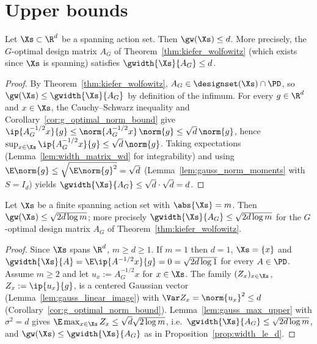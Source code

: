 \section{Upper bounds}
\label{sec:width_upper}

\begin{proposition}\label{prop:width_le_d}
\leanok
{}
Let $\Xs \subset \R^d$ be a spanning action set. Then $\gw(\Xs) \le d$. More precisely, the
$G$-optimal design matrix $A_G$ of Theorem~\ref{thm:kiefer_wolfowitz} (which exists since
$\Xs$ is spanning) satisfies $\gwidth{\Xs}{A_G} \le d$.
\end{proposition}

\begin{proof}
\leanok
{}
By Theorem~\ref{thm:kiefer_wolfowitz}, $A_G \in \designset(\Xs) \cap \PD$, so
$\gw(\Xs) \le \gwidth{\Xs}{A_G}$ by definition of the infimum. For every $g \in \R^d$ and
$x \in \Xs$, the Cauchy--Schwarz inequality and Corollary~\ref{cor:g_optimal_norm_bound}
give $\ip{A_G^{-1/2}x}{g} \le \norm{A_G^{-1/2}x}\,\norm{g} \le \sqrt d\,\norm{g}$, hence
$\sup_{x\in\Xs}\ip{A_G^{-1/2}x}{g} \le \sqrt d\,\norm{g}$. Taking expectations
(Lemma~\ref{lem:width_matrix_wd} for integrability) and using
$\E\norm{g} \le \sqrt{\E\norm{g}^2} = \sqrt d$ (Lemma~\ref{lem:gauss_norm_moments} with
$S = I_d$) yields $\gwidth{\Xs}{A_G} \le \sqrt d \cdot \sqrt d = d$.
\end{proof}

\begin{proposition}\label{prop:width_finite}
\leanok
{}
Let $\Xs$ be a finite spanning action set with $\abs{\Xs} = m$. Then
$\gw(\Xs) \le \sqrt{2 d \log m}$; more precisely $\gwidth{\Xs}{A_G} \le \sqrt{2d\log m}$
for the $G$-optimal design matrix $A_G$ of Theorem~\ref{thm:kiefer_wolfowitz}.
\end{proposition}

\begin{proof}
\leanok
{}
Since $\Xs$ spans $\R^d$, $m \ge d \ge 1$. If $m = 1$ then $d = 1$, $\Xs = \{x\}$ and
$\gwidth{\Xs}{A} = \E\ip{A^{-1/2}x}{g} = 0 = \sqrt{2d\log 1}$ for every $A \in \PD$.
Assume $m \ge 2$ and let $u_x := A_G^{-1/2}x$ for $x \in \Xs$. The family
$(Z_x)_{x\in\Xs}$, $Z_x := \ip{u_x}{g}$, is a centered Gaussian vector
(Lemma~\ref{lem:gauss_linear_image}) with $\Var Z_x = \norm{u_x}^2 \le d$
(Corollary~\ref{cor:g_optimal_norm_bound}). Lemma~\ref{lem:gauss_max_upper} with
$\sigma^2 = d$ gives $\E\max_{x\in\Xs}Z_x \le \sqrt{d}\sqrt{2\log m}$, i.e.\
$\gwidth{\Xs}{A_G} \le \sqrt{2d\log m}$, and $\gw(\Xs) \le \gwidth{\Xs}{A_G}$ as in
Proposition~\ref{prop:width_le_d}.
\end{proof}

